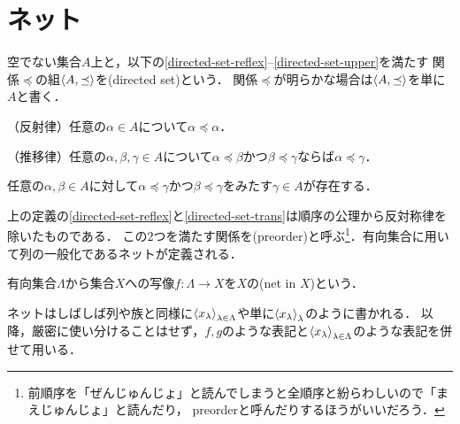 \documentclass[../main.tex]{subfiles}
\begin{document}
\section{ネット}
\begin{thmbox}
\begin{definition}
空でない集合\(A\)上と，以下の\ref{directed-set-reflex}--\ref{directed-set-upper}を満たす
関係\(\preceq\)の組\(\langle A, \preceq \rangle\)を(directed set)という．
関係\(\preceq\)が明らかな場合は\(\langle A, \preceq \rangle\)を単に\(A\)と書く．
\begin{conditions}
    \item\label{directed-set-reflex} （反射律）任意の\(\alpha \in A\)について\(\alpha \preceq \alpha\)．
    \item\label{directed-set-trans} （推移律）任意の\(\alpha, \beta, \gamma \in A\)について\(\alpha \preceq \beta\)かつ\(\beta \preceq \gamma\)ならば\(\alpha \preceq \gamma\)．
    \item\label{directed-set-upper} 任意の\(\alpha, \beta \in A\)に対して\(\alpha \preceq \gamma\)かつ\(\beta \preceq \gamma\)をみたす\(\gamma \in A\)が存在する．
\end{conditions}
\end{definition}
\end{thmbox}

上の定義の\ref{directed-set-reflex}と\ref{directed-set-trans}は順序の公理から反対称律を除いたものである．
この\(2\)つを満たす関係を(preorder)と呼ぶ\footnote{%
前順序を「ぜんじゅんじょ」と読んでしまうと全順序と紛らわしいので「まえじゅんじょ」と読んだり，
preorderと呼んだりするほうがいいだろう．}．有向集合に用いて列の一般化であるネットが定義される．

\begin{thmbox}
\begin{definition}
有向集合\(\Lambda\)から集合\(X\)への写像\(f \colon \Lambda \to X\)を\(X\)の(net in \(X\))という．
\end{definition}
\end{thmbox}

ネットはしばしば列や族と同様に\({\langle {x}_\lambda \rangle}_{\lambda \in \Lambda}\)や単に\({\langle x_\lambda \rangle}_{\lambda}\)のように書かれる．
以降，厳密に使い分けることはせず，\(f, g\)のような表記と\({\langle {x}_\lambda \rangle}_{\lambda \in \Lambda}\)のような表記を併せて用いる．
\end{document}
